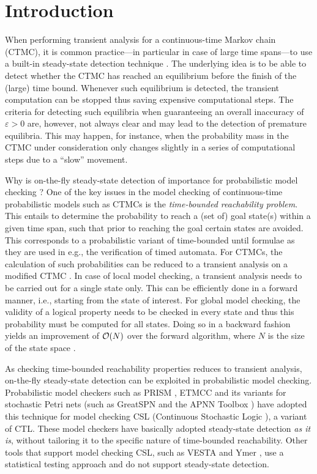 \documentclass[a4paper,11pt]{article}
\newcommand{\Section}[1]{\section{#1}}
\begin{document}
\Section{Introduction}
When performing transient analysis for a continuous-time Markov chain (CTMC), it is common practice---in particular in case of large time spans---to use a built-in steady-state detection technique \cite{MalhotraMT_MR94,YounesKNP_STTT05}. 
The underlying idea is to be able to detect whether the CTMC has reached an equilibrium before the finish of the (large) time bound. Whenever such equilibrium is detected, the transient computation can be stopped thus saving expensive computational steps. 
The criteria for detecting such equilibria when guaranteeing an overall inaccuracy of $\varepsilon > 0$ are, however, not always clear and may lead to the detection of premature equilibria. 
This may happen, for instance, when the probability mass in the CTMC under consideration only changes slightly in a series of computational steps due to a ``slow'' movement.

Why is on-the-fly steady-state detection of importance for probabilistic model checking \cite{Kwiatkowska_SLCS03}?
One of the key issues in the model checking of continuous-time probabilistic models such as 
CTMCs is the \emph{time-bounded reachability problem}. 
This entails to determine the probability to reach a (set of) goal state(s) within a given time span, 
such that prior to reaching the goal certain states are avoided. 
This corresponds to a probabilistic variant of time-bounded until formulae as they are used in 
e.g., the verification of timed automata.
For CTMCs, the calculation of such probabilities can be reduced to a transient analysis on a 
modified CTMC \cite{BaierHHK_TSE03}. 
In case of local model checking, a transient analysis needs to be carried out for a single state 
only.
This can be efficiently done in a forward manner, i.e., starting from the state of interest. 
For global model checking, the validity of a logical property needs to be checked in every state 
and thus this probability must be computed for all states. 
Doing so in a backward fashion yields an improvement of ${\cal O}(N)$ over the forward algorithm,
where $N$ is the size of the state space \cite{KatoenKNP_LNCS01}.

As checking time-bounded reachability properties reduces to transient analysis, on-the-fly steady-state detection can be exploited in probabilistic model checking.
Probabilistic model checkers such as PRISM \cite{KwiatkowskaNP_QEST04}, ETMCC \cite{HermansKMS_IJSTTT03} and its variants for stochastic
Petri nets (such as GreatSPN \cite{DAprileDS_DS04} and the APNN Toolbox \cite{BuchholzFKT_MMECCS03}) have adopted this technique
for model checking CSL (Continuous Stochastic Logic \cite{AzizSSB_ACMTCL00,BaierHHK_TSE03}), a variant of CTL.
These model checkers have basically adopted steady-state detection \emph{as it is}, without 
tailoring it to the specific nature of time-bounded reachability.
Other tools that support model checking CSL, such as VESTA \cite{SenVA_CAV05} and Ymer \cite{Younes_CAV05}, use a statistical testing approach and do not support steady-state detection. 
\end{document}
